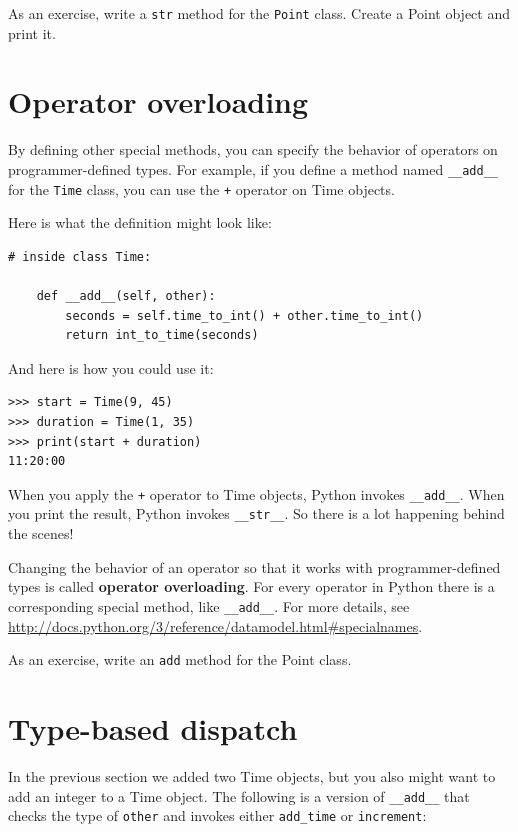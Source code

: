 \documentclass[10pt]{book}
\begin{document}
As an exercise, write a {\tt str} method for the {\tt Point} class.
Create a Point object and print it.


\section{Operator overloading}
\label{operator.overloading}

By defining other special methods, you can specify the behavior
of operators on programmer-defined types.  For example, if you define
a method named \verb"__add__" for the {\tt Time} class, you can use the
{\tt +} operator on Time objects.

Here is what the definition might look like:

\begin{verbatim}
# inside class Time:

    def __add__(self, other):
        seconds = self.time_to_int() + other.time_to_int()
        return int_to_time(seconds)
\end{verbatim}
%
And here is how you could use it:

\begin{verbatim}
>>> start = Time(9, 45)
>>> duration = Time(1, 35)
>>> print(start + duration)
11:20:00
\end{verbatim}
%
When you apply the {\tt +} operator to Time objects, Python invokes
\verb"__add__".  When you print the result, Python invokes
\verb"__str__".  So there is a lot happening behind the scenes!

Changing the behavior of an operator so that it works with
programmer-defined types is called {\bf operator overloading}.  For every
operator in Python there is a corresponding special method, like
\verb"__add__".  For more details, see
\url{http://docs.python.org/3/reference/datamodel.html#specialnames}.

As an exercise, write an {\tt add} method for the Point class.


\section{Type-based dispatch}

In the previous section we added two Time objects, but you
also might want to add an integer to a Time object.  The
following is a version of \verb"__add__"
that checks the type of {\tt other} and invokes either
\verb"add_time" or {\tt increment}:
\end{document}
